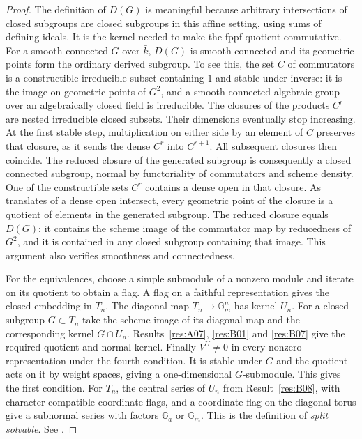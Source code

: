 \documentclass[11pt,a4paper,openany,oneside]{book}
\theoremstyle{resultstyle}
\theoremstyle{definition}
\numberwithin{equation}{chapter}
\begin{document}
\begin{proof}
The definition of \(D(G)\) is meaningful because arbitrary
intersections of closed subgroups are closed subgroups in this
affine setting, using sums of defining ideals. It is the kernel
needed to make the fppf quotient commutative. For a smooth connected
\(G\) over \(\bar k\), \(D(G)\) is smooth connected and its geometric
points form the ordinary derived subgroup. To see this, the set
\(C\) of commutators is a constructible irreducible subset containing
\(1\) and stable under inverse: it is the image on geometric points
of \(G^2\), and a smooth connected algebraic group over an
algebraically closed field is irreducible. The closures of the
products \(C^r\) are nested irreducible closed subsets.
Their dimensions eventually stop increasing. At the first stable
step, multiplication on either side by an element of \(C\) preserves
that closure, as it sends the dense \(C^r\) into \(C^{r+1}\).
All subsequent closures then coincide. The reduced closure of the
generated subgroup is consequently a closed connected subgroup,
normal by functoriality of commutators and scheme density.
One of the constructible sets \(C^r\) contains a dense open in that
closure. As translates of a dense open intersect, every geometric
point of the closure is a quotient of elements in the generated
subgroup. The reduced closure equals \(D(G)\): it contains the
scheme image of the commutator map by reducedness of \(G^2\), and
it is contained in any closed subgroup containing that image.
This argument also verifies smoothness and connectedness.

For the equivalences, choose a simple submodule of a nonzero module
and iterate on its quotient to obtain a flag. A flag on a faithful
representation gives the closed embedding in \(T_n\).
The diagonal map \(T_n\to\mathbb G_m^n\) has kernel \(U_n\).
For a closed subgroup \(G\subset T_n\) take the scheme image of its
diagonal map and the corresponding kernel \(G\cap U_n\).
Results~\ref{res:A07}, \ref{res:B01} and \ref{res:B07} give the
required quotient and normal kernel. Finally \(V^U\ne0\) in every
nonzero representation under the fourth condition. It is stable
under \(G\) and the quotient acts on it by weight spaces, giving
a one-dimensional \(G\)-submodule. This gives the first condition.
For \(T_n\), the central series of \(U_n\) from
Result~\ref{res:B08}, with character-compatible coordinate flags,
and a coordinate flag on the diagonal torus give a subnormal series
with factors \(\mathbb G_a\) or \(\mathbb G_m\). This is the definition
of \emph{split solvable}. See \cite[Corollary 6.19, Propositions
6.20, 6.30, Definition 6.33, Propositions 16.2--16.4]{milne}.
\end{proof}
\end{document}
